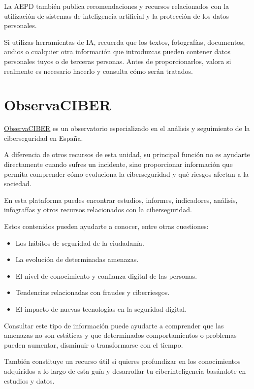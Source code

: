 \documentclass[
  spanish,
  a4paper,
  openany]{book}
\begin{document}
La AEPD también publica recomendaciones y recursos relacionados con la utilización de sistemas de inteligencia artificial y la protección de los datos personales.

Si utilizas herramientas de IA, recuerda que los textos, fotografías, documentos, audios o cualquier otra información que introduzcas pueden contener datos personales tuyos o de terceras personas. Antes de proporcionarlos, valora si realmente es necesario hacerlo y consulta cómo serán tratados.

\section{ObservaCIBER}\label{observaciber}

\href{https://observaciber.es/}{ObservaCIBER} es un observatorio especializado en el análisis y seguimiento de la ciberseguridad en España.

A diferencia de otros recursos de esta unidad, su principal función no es ayudarte directamente cuando sufres un incidente, sino proporcionar información que permita comprender cómo evoluciona la ciberseguridad y qué riesgos afectan a la sociedad.

En esta plataforma puedes encontrar estudios, informes, indicadores, análisis, infografías y otros recursos relacionados con la ciberseguridad.

Estos contenidos pueden ayudarte a conocer, entre otras cuestiones:

\begin{itemize}
\item
  Los hábitos de seguridad de la ciudadanía.
\item
  La evolución de determinadas amenazas.
\item
  El nivel de conocimiento y confianza digital de las personas.
\item
  Tendencias relacionadas con fraudes y ciberriesgos.
\item
  El impacto de nuevas tecnologías en la seguridad digital.
\end{itemize}

Consultar este tipo de información puede ayudarte a comprender que las amenazas no son estáticas y que determinados comportamientos o problemas pueden aumentar, disminuir o transformarse con el tiempo.

También constituye un recurso útil si quieres profundizar en los conocimientos adquiridos a lo largo de esta guía y desarrollar tu ciberinteligencia basándote en estudios y datos.
\end{document}
